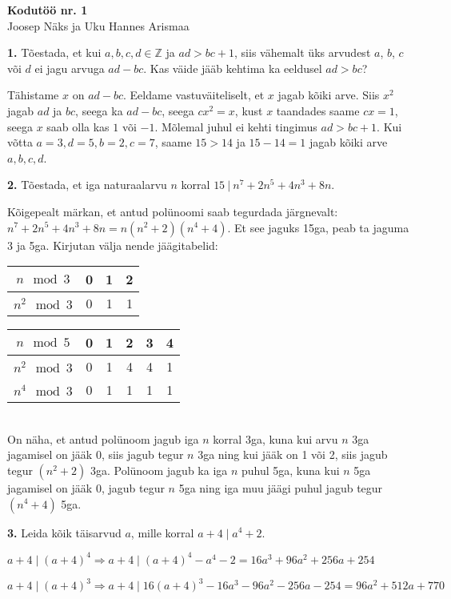 \documentclass[a4paper, 10pt]{article}
\begin{document}
\begin{center}
\Large\textbf{Kodutöö nr. 1}\\
\small{Joosep Näks ja Uku Hannes Arismaa}
\end{center}
\textbf{1.} Tõestada, et kui $a,b,c,d\in\mathbb{Z}$ ja $ad>bc+1$, siis vähemalt üks arvudest $a$, $b$, $c$ või $d$ ei jagu arvuga $ad-bc$. Kas väide jääb kehtima ka eeldusel $ad>bc$?

\bigskip
Tähistame $x$ on $ad-bc$. Eeldame vastuväiteliselt, et $x$ jagab kõiki arve. Siis $x^2$ jagab $ad$ ja $bc$, seega ka $ad-bc$, seega $cx^2=x$, kust $x$ taandades saame $cx=1$, seega $x$ saab olla kas $1$ või $-1$. Mõlemal juhul ei kehti tingimus $ad>bc+1$. Kui võtta $a=3,d=5,b=2,c=7$, saame $15>14$ ja $15-14=1$ jagab kõiki arve $a,b,c,d$.

\bigskip
\noindent\textbf{2.} Tõestada, et iga naturaalarvu $n$ korral $15\ |\ n^7+2n^5+4n^3+8n$.

\bigskip

Kõigepealt märkan, et antud polünoomi saab tegurdada järgnevalt: $n^7+2n^5+4n^3+8n=n(n^2+2)(n^4+4)$. Et see jaguks 15ga, peab ta jaguma 3 ja 5ga. Kirjutan välja nende jäägitabelid:\\
\begin{tabular}{|c|c|c|c|}
\hline
$n \mod 3$&0&1&2\\
\hline
$n^2 \mod 3$&0&1&1\\
\hline
\end{tabular}
\begin{tabular}{|c|c|c|c|c|c|}
\hline
$n \mod 5$&0&1&2&3&4\\
\hline
$n^2 \mod 3$&0&1&4&4&1\\
\hline
$n^4 \mod 3$&0&1&1&1&1\\
\hline
\end{tabular}\\
On näha, et antud polünoom jagub iga $n$ korral 3ga, kuna kui arvu $n$ 3ga jagamisel on jääk 0, siis jagub tegur $n$ 3ga ning kui jääk on 1 või 2, siis jagub tegur $(n^2+2)$ 3ga. Polünoom jagub ka iga $n$ puhul 5ga, kuna kui $n$ 5ga jagamisel on jääk 0, jagub tegur $n$ 5ga ning iga muu jäägi puhul jagub tegur $(n^4+4)$ 5ga.

\bigskip

\noindent \textbf{3.} Leida kõik täisarvud $a$, mille korral $a+4\mid a^4+2$.

\bigskip
$a+4 \mid (a+4)^4\Rightarrow a+4\mid(a+4)^4-a^4-2=16a^3+96a^2+256a+254$

$a+4 \mid (a+4)^3\Rightarrow a+4\mid16(a+4)^3-16a^3-96a^2-256a-254=96a^2+512a+770$
\end{document}
